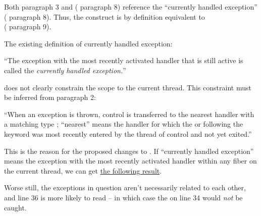 \newpage
{}\label{throw}

Both  paragraph 3 and 
( paragraph 8) reference the ``currently handled
exception'' ( paragraph 8). Thus, the
construct  is by definition equivalent to\\
( paragraph 9).

The existing definition of currently handled exception:

``The exception with the most recently activated handler that is still active
is called the \emph{currently handled exception.}''

does not clearly constrain the scope to the current thread. This constraint
must be inferred from  paragraph 2:

``When an exception is thrown, control is transferred to the nearest handler
with a matching type ; ``nearest'' means the handler for
which the  or
 following the  keyword was
most recently entered by the thread of control and not yet exited.''

This is the reason for the proposed changes to .
If ``currently handled exception'' means the exception with the
most recently activated handler within any fiber on the current thread, we can get
\href{https://github.com/secondlife/3p-boost/blob/nat/exstate/tests/nullary_throw.cpp}{the following result}.


Worse still, the exceptions in question aren't necessarily related to each
other, and line 36 is more likely to read  --
in which case the  on line 34 would \emph{not} be caught.
